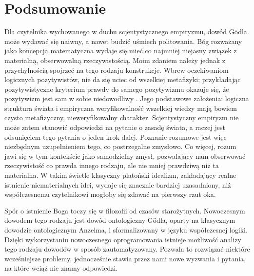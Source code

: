 \documentclass[
	runningheads
]{llncs}
\begin{document}
\section{Podsumowanie} \label{sec:summary}
Dla czytelnika wychowanego w duchu scjentystycznego empiryzmu, dowód G\"odla może wydawać się naiwny, a nawet budzić uśmiech politowania. Bóg rozważany jako koncepcja matematyczna wydaje się mieć co najmniej niejasny związek z materialną, obserwowalną rzeczywistością. Moim zdaniem należy jednak z przychylnością spojrzeć na tego rodzaju konstrukcje. Wbrew oczekiwaniom logicznych pozytywistów, nie da się uciec od wszelkiej metafizyki; przykładając pozytywistyczne kryterium prawdy do samego pozytywizmu okazuje się, że pozytywizm jest sam w sobie niedowodliwy \cite{putnam1985} \cite{stanford2005}. Jego podstawowe założenia: logiczna struktura świata i empiryczna weryfikowalność wszelkiej wiedzy mają bowiem czysto metafizyczny, nieweryfikowalny charakter. Scjentystyczny empiryzm nie może zatem stanowić odpowiedzi na pytanie o zasadę świata, a raczej jest odsunięciem tego pytania o jeden krok dalej. Poznanie rozumowe jest więc niezbędnym uzupełnieniem tego, co postrzegalne zmysłowo. Co więcej, rozum jawi się w tym kontekście jako samodzielny zmysł, pozwalający nam obserwować rzeczywistość co prawda innego rodzaju, ale nie mniej prawdziwą niż ta materialna. W takim świetle klasyczny platoński idealizm, zakładający realne istnienie niematerialnych idei, wydaje się znacznie bardziej uzasadniony, niż współczesnemu czytelnikowi mogłoby się zdawać na pierwszy rzut oka. 

Spór o istnienie Boga toczy się w filozofii od czasów starożytnych. Nowoczesnym dowodem tego rodzaju jest dowód ontologiczny G\"odla, oparty na klasycznym dowodzie ontologicznym Anzelma, i sformalizowany w języku współczesnej logiki. Dzięki wykorzystaniu nowoczesnego oprogramowania istnieje możliwość analizy tego rodzaju dowodów w sposób zautomatyzowany. Pozwala to rozwiązać niektóre wcześniejsze problemy, jednocześnie stawia przez nami nowe wyzwania i pytania, na które wciąż nie znamy odpowiedzi. 




\end{document}
